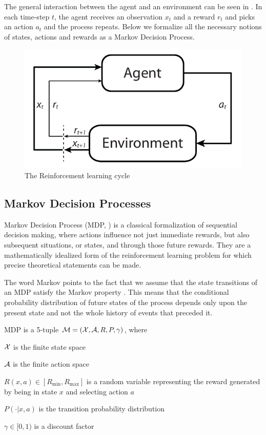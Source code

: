 The general interaction between the agent and an environment can be seen in . In each time-step $t$, the agent receives an observation $x_t$ and a reward $r_t$ and picks an action $a_t$ and the process repeats. Below we formalize all the necessary notions of states, actions and rewards as a Markov Decision Process.

\begin{figure}[h]
\center
\includegraphics[width=.6\linewidth]{gfx/rl_loop.pdf}
\caption{The Reinforcement learning cycle}
\label{fig:prelim:rlloop}
\end{figure}

\subsection{Markov Decision Processes}

Markov Decision Process (MDP, \citet{bellman1957markovian}) is a classical formalization of sequential decision making, where actions influence not just immediate rewards, but also subsequent situations, or states, and through those future rewards. They are a mathematically idealized form of the reinforcement learning problem for which precise theoretical statements can be made.

The word Markov points to the fact that we assume that the state transitions of an MDP satisfy the Markov property \cite{???}. This means that the conditional probability distribution of future states of the process depends only upon the present state and not the whole history of events that preceded it.

\begin{definition}

MDP is a 5-tuple $\mathcal{M} = (\mathcal{X}, \mathcal{A}, R, P, \gamma)$, where 

$\mathcal{X}$ is the finite state space

$\mathcal{A}$ is the finite action space

$R(x, a) \in [R_{\min}, R_{\max}]$ is a random variable representing the reward generated by being in state $x$ and selecting action $a$

$P(\cdot|x, a)$ is the transition probability distribution

$\gamma \in [0, 1)$ is a discount factor
\end{definition}

